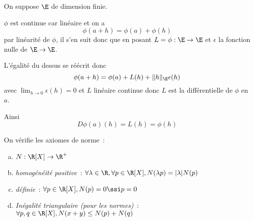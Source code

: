 \documentclass{article}
\begin{document}
\exercice{}
On suppose $\E$ de dimension finie.

$\phi$ est continue car linéaire et on a
\[
\phi(a+h) = \phi(a) + \phi(h)
\]
par linéarité de $\phi$, il s'en suit donc que en posant $L = \phi : \E \rightarrow \E$ et $\epsilon$ la fonction nulle de $\E \rightarrow \E$.

L'égalité du dessus se réécrit donc
\[
\phi(a+h) = \phi(a) + L(h) + \Vert h \Vert_\E \epsilon(h)
\]
avec $\lim_{h \to 0} \epsilon(h) = 0$ et $L$ linéaire continue donc $L$ est la différentielle de $\phi$ en $a$.

Ainsi
\[
D\phi(a)(h) = L(h) = \phi(h)
\]

\exercice{}
On vérifie les axiomes de norme~:
\begin{enumerate}[(a)]
\item $N : \R[X] \rightarrow \R^+$
\item \textit{homogénéité positive}~: $\forall \lambda \in \R, \forall p \in \R[X], N(\lambda p) = |\lambda| N(p)$
\item \textit{définie}~: $\forall p \in \R[X], N(p) = 0 \ssi p=0$
\item \textit{Inégalité triangulaire (pour les normes)}~: $\forall p,q \in \R[X], N(x+y) \leq N(p) + N(q)$
\end{enumerate}
\end{document}
